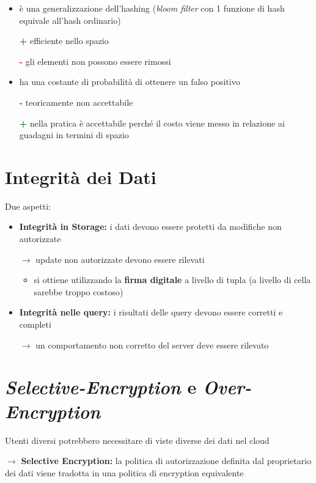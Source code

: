 \documentclass{report}
\begin{document}
\begin{itemize}
    \item è una generalizzazione dell'hashing (\textit{bloom filter} con 1 funzione di hash equivale all'hash ordinario)
    
    \textcolor{darkgreen}{\textbf{+}} efficiente nello spazio
    
    \textcolor{red}{\textbf{-}} gli elementi non possono essere rimossi

    \item ha una costante di probabilità di ottenere un falso positivo

    \textcolor{red}{\textbf{-}} teoricamente non accettabile 

    \textcolor{darkgreen}{\textbf{+}} nella pratica è accettabile perché il costo viene messo in relazione ai guadagni in termini di spazio
\end{itemize}

\newpage
\section{Integrità dei Dati}
Due aspetti:
\begin{itemize}
    \item \textbf{Integrità in Storage:} i dati devono essere protetti da modifiche non autorizzate
    
    $\rightarrow$ update non autorizzate devono essere rilevati
    \begin{itemize}
        \item si ottiene utilizzando la \textbf{firma digitale} a livello di tupla (a livello di cella sarebbe troppo costoso)
    \end{itemize}

    \item \textbf{Integrità nelle query:} i risultati delle query devono essere corretti e completi
    
    $\rightarrow$ un comportamento non corretto del server deve essere rilevato
\end{itemize}

\section{\textit{Selective-Encryption} e \textit{Over-Encryption}}
Utenti diversi potrebbero necessitare di viste diverse dei dati nel cloud

$\rightarrow$ \textbf{Selective Encryption:} la politica di autorizzazione definita dal proprietario dei dati 
viene tradotta in una politica di encryption equivalente
\end{document}
